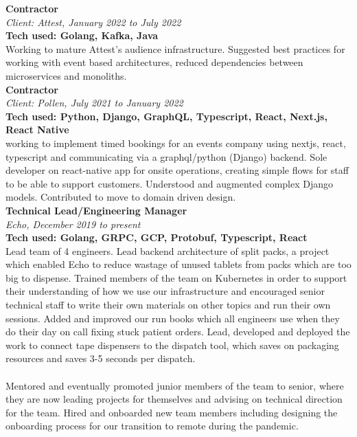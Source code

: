 \documentclass{article}
\begin{document}
\begin{flushleft}
\textbf{Contractor}\\
\textit{Client: Attest, January 2022 to July 2022}\\
\textbf{Tech used: Golang, Kafka, Java}\\[5pt]
Working to mature Attest’s audience infrastructure. Suggested best practices for working with event based architectures, reduced dependencies between microservices and monoliths.\\[10pt]

\textbf{Contractor}\\
\textit{Client: Pollen, July 2021 to January 2022}\\
\textbf{Tech used: Python, Django, GraphQL, Typescript, React, Next.js, React Native}\\[5pt]
working to implement timed bookings for an events company using nextjs, react, typescript and communicating via a graphql/python (Django) backend. Sole developer on react-native app for onsite operations, creating simple flows for staff to be able to support customers. Understood and augmented complex Django models. Contributed to move to domain driven design.\\[10pt]

\textbf{Technical Lead/Engineering Manager}\\
\textit{Echo, December 2019 to present}\\
\textbf{Tech used: Golang, GRPC, GCP, Protobuf, Typescript, React}\\[5pt]
Lead team of 4 engineers. Lead backend architecture of split packs, a project which enabled Echo to reduce wastage of unused tablets from packs which are too big to dispense. Trained members of the team on Kubernetes in order to support their understanding of how we use our infrastructure and encouraged senior technical staff to write their own materials on other topics and run their own sessions. Added and improved our run books which all engineers use when they do their day on call fixing stuck patient orders. Lead, developed and deployed the work to connect tape dispensers to the dispatch tool, which saves on packaging resources and saves 3-5 seconds per dispatch.

\paragraph{}Mentored and eventually promoted junior members of the team to senior, where they are now leading projects for themselves and advising on technical direction for the team. Hired and onboarded new team members including designing the onboarding process for our transition to remote during the pandemic.


\end{flushleft}
\end{document}

